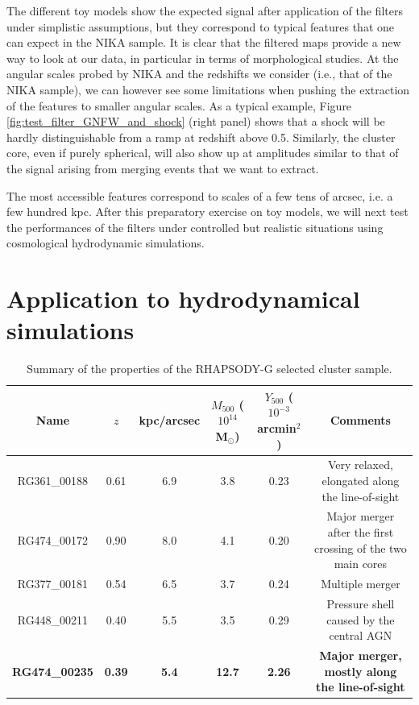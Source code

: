\documentclass[twocolumn,traditabstract]{aa}
\begin{document}
The different toy models show the expected signal after application of the filters under simplistic assumptions, but they correspond to typical features that one can expect in the NIKA sample. It is clear that the filtered maps provide a new way to look at our data, in particular in terms of morphological studies. At the angular scales probed by NIKA and the redshifts we consider (i.e., that of the NIKA sample), we can however see some limitations when pushing the extraction of the features to smaller angular scales. As a typical example, Figure \ref{fig:test_filter_GNFW_and_shock} (right panel) shows that a shock will be hardly distinguishable from a ramp at redshift above 0.5. Similarly, the cluster core, even if purely spherical, will also show up at amplitudes similar to that of the signal arising from merging events that we want to extract. 

The most accessible features correspond to scales of a few tens of arcsec, i.e. a few hundred kpc. After this preparatory exercise on toy models, we will next test the performances of the filters under controlled but realistic situations using cosmological hydrodynamic simulations.

\section{Application to hydrodynamical simulations}\label{sec:Application_to_hydrodynamical_simulations}
\begin{table}[]
\caption{\footnotesize{Summary of the properties of the RHAPSODY-G selected cluster sample.}}
\begin{center}
\begin{tabular}{c|c|c|c|c|c}
\hline
\hline
Name & $z$ & kpc/arcsec & $M_{500}$ ($10^{14}$ M$_{\odot}$)& $Y_{500}$ ($10^{-3}$arcmin$^2$) & Comments \\
\hline
RG361\_00188 & 0.61 & 6.9 & 3.8 & 0.23 & Very relaxed, elongated along the line-of-sight \\ 
RG474\_00172 & 0.90 & 8.0 & 4.1 & 0.20 & Major merger after the first crossing of the two main cores \\ 
RG377\_00181 & 0.54 & 6.5 & 3.7 & 0.24 & Multiple merger \\
RG448\_00211 & 0.40 & 5.5 & 3.5 & 0.29 & Pressure shell caused by the central AGN \\ 
{\bf RG474\_00235} & {\bf 0.39} & {\bf 5.4} & {\bf 12.7} & {\bf 2.26} & {\bf Major merger, mostly along the line-of-sight} \\ 
\hline
\end{tabular}
\end{center}
\label{tab:rhapsody_summary}
\end{table}
\end{document}
